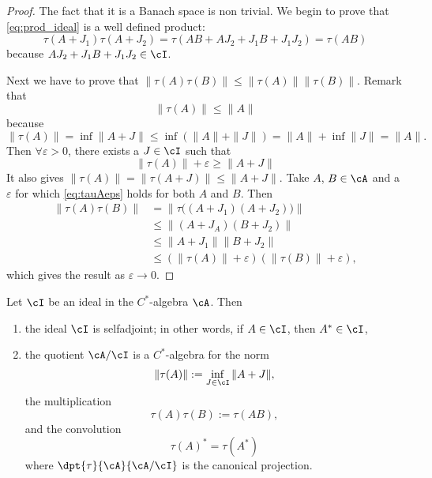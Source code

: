 \begin{proof}
	The fact that it is a Banach space is non trivial\cite{thomaslassen}. We begin to prove that \eqref{eq:prod_ideal} is a well defined product:
	\begin{equation}
		\tau(A+J_1)\tau(A+J_2)=\tau(AB+AJ_2+J_1B+J_1J_2)
		=\tau(AB)
	\end{equation}
	because $AJ_2+J_1B+J_1J_2\in\cI$.

	Next we have to prove that $\|\tau(A)\tau(B)\|\leq\|\tau(A)\|\|\tau(B)\|$. Remark that
	\begin{equation} \label{eq:tauAA}
		\|\tau(A)\|\leq\|A\|
	\end{equation}
	because
	\[
		\|\tau(A)\|=\inf\|A+J\|
		\leq\inf(\|A\|+\|J\|)
		=\|A\|+\inf\|J\|
		=\|A\|.
	\]
	Then $\forall\varepsilon>0$, there exists a $J\in\cI$ such that
	\begin{equation} \label{eq:tauAeps}
		\|\tau(A)\|+\varepsilon\geq\|A+J\|
	\end{equation}
	It also gives $\|\tau(A)\|=\|\tau(A+J)\|\leq\|A+J\|$. Take $A$, $B\in\cA$ and a $\varepsilon$ for which \eqref{eq:tauAeps} holds for both $A$ and $B$. Then
	\begin{equation}
		\begin{split}
			\|\tau(A)\tau(B)\|&=\|\tau\big( (A+J_1)(A+J_2)\big)\|\\
			&\leq\|(A+J_A)(B+J_2)\|\\
			&\leq\|A+J_1\|\|B+J_2\|\\
			&\leq(\|\tau(A)\|+\varepsilon)(\|\tau(B)\|+\varepsilon),
		\end{split}
	\end{equation}
	which gives the result as $\varepsilon\to 0$.

\end{proof}

\begin{theorem} \label{tho_idautadjquo}
	Let $\cI$ be an ideal in the $C^*$-algebra $\cA$. Then

	\begin{enumerate}
		\item the ideal $\cI$ is selfadjoint; in other words, if $A\in\cI$, then $A^*\in\cI$,  \label{enuni}
		\item the quotient $\cA/\cI$ is a $C^*$-algebra for the norm \label{enunii}
		      \[
			      \| \tau(A)\|:=\inf_{J\in\cI}\| A+J \| ,
		      \]
		      the multiplication
		      \[
			      \tau(A)\tau(B):=\tau(AB),
		      \]
		      and the convolution
		      \[
			      \tau(A)^*=\tau(A^*)
		      \]
		      where $\dpt{\tau}{\cA}{\cA/\cI}$ is the canonical projection.

	\end{enumerate}
\end{theorem}

